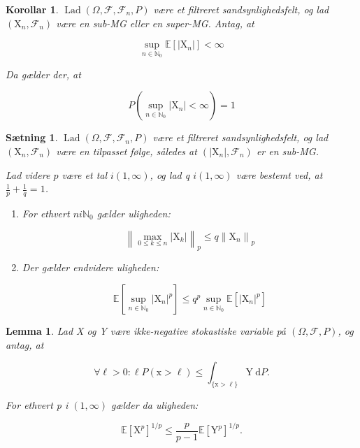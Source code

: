 \documentclass{article}
\newcommand{\1}{\mathbbm{1}}
\theoremstyle{boxed}
\newtheorem{lemma}[theorem]{Lemma}
\newtheorem{corollary}[theorem]{Korollar}
\newtheorem{proposition}[theorem]{Sætning}
\begin{document}
\begin{theorem-box}
    \begin{corollary}
        $\operatorname{Lad}\left(\Omega, \mathcal{F}, \mathcal{F}_n, P\right)$ være et filtreret sandsynlighedsfelt, og lad $\left(\mathrm{X}_n, \mathcal{F}_n\right)$ være en sub-MG eller en super-MG. Antag, at

$$
\sup _{n \in \mathbb{N}_0} \mathbb{E}\left[\left|\mathrm{X}_n\right|\right]<\infty
$$


Da gælder der, at

$$
P\left(\sup _{n \in \mathbb{N}_0}\left|\mathrm{X}_n\right|<\infty\right)=1
$$

    \end{corollary}
\end{theorem-box}
\begin{theorem-box}
    \begin{proposition}
        $\operatorname{Lad}\left(\Omega, \mathcal{F}, \mathcal{F}_n, P\right)$ være et filtreret sandsynlighedsfelt, og lad $\left(\mathrm{X}_n, \mathcal{F}_n\right)$ være en tilpasset følge, således at $\left(\left|\mathrm{X}_n\right|, \mathcal{F}_n\right)$ er en sub-MG.

Lad videre $p$ være et tal $i(1, \infty)$, og lad q $i(1, \infty)$ være bestemt ved, at $\frac{1}{p}+\frac{1}{q}=1$.
\begin{enumerate}
    \item[\textnormal{(i)}] For ethvert $n i \mathbb{N}_0$ gælder uligheden:

    $$
    \left\|\max _{0 \leq k \leq n}\left|\mathrm{X}_k\right|\right\|_p \leq q\left\|\mathrm{X}_n\right\|_p
    $$
    \item[\textnormal{(ii)}] Der gælder endvidere uligheden:

    $$
    \mathbb{E}\left[\sup _{n \in \mathbb{N}_0}\left|\mathrm{X}_n\right|^p\right] \leq q^p \sup _{n \in \mathbb{N}_0} \mathbb{E}\left[\left|\mathrm{X}_n\right|^p\right]
    $$    
\end{enumerate}
    \end{proposition}
\end{theorem-box}
\begin{theorem-box}
    \begin{lemma}
        Lad X og Y være ikke-negative stokastiske variable på $(\Omega, \mathcal{F}, P)$, og antag, at

$$
\forall \ell>0: \ell P(\mathrm{x}>\ell) \leq \int_{\{\mathrm{x}>\ell\}} \mathrm{Y} \mathrm{~d} P .
$$


For ethvert p i $(1, \infty)$ gælder da uligheden:

$$
\mathbb{E}\left[\mathrm{X}^p\right]^{1 / p} \leq \frac{p}{p-1} \mathbb{E}\left[\mathrm{Y}^p\right]^{1 / p} .
$$

    \end{lemma}
\end{theorem-box}
\end{document}
